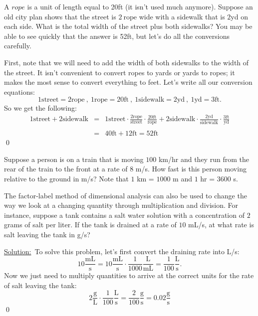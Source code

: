 \begin{eg} A $rope$ is a unit of length equal to 20ft (it isn't used much anymore). Suppose an old city plan shows that the street is $2\ \mbox{rope}$ wide with a sidewalk that is $2$yd on each side. What is the total width of the street plus both sidewalks? You may be able to see quickly that the answer is 52ft,  but let's do all the conversions carefully.

\par 

First, note that we will need to add the width of both sidewalks to the width of the street. It isn't convenient to convert ropes to yards or yards to ropes; it makes the most sense to convert everything to feet. Let's write all our conversion equations:
\[
1 \mbox{street} = 2 \mbox{rope}\ ,\ 1\mbox{rope} = 20\mbox{ft}\ ,\ 1\mbox{sidewalk} = 2\mbox{yd}\ ,\ 1\mbox{yd} = 3\mbox{ft}.
\]
So we get the following:
\begin{eqnarray*}
1\mbox{street} + 2\mbox{sidewalk} & = & 1\mbox{street}\cdot\frac{2\mbox{rope}}{\mbox{street}}\cdot\frac{20\mbox{ft}}{\mbox{rope}} + 2\mbox{sidewalk}\cdot\frac{2\mbox{yd}}{\mbox{sidewalk}}\cdot\frac{3\mbox{ft}}{\mbox{yd}}\\\\
\ & = & 40\mbox{ft}+12\mbox{ft}= 52\mbox{ft}
\end{eqnarray*}\qed
\end{eg}
\par

\begin{question} Suppose a person is on a train that is moving $100$ km/hr and they run from the rear of the train to the front at a rate of $8$ m/s. How fast is this person moving relative to the ground in m/s? Note that $1$ km = $1000$ m and $1$ hr = $3600$ s.
\end{question}

\par

\begin{eg} The factor-label method of dimensional analysis can also be used to change the way we look at a changing quantity through multiplication and division. For instance, suppose a tank contains a salt water solution with a concentration of $2$ grams of salt per liter. If the tank is drained at a rate of $10$ mL/s, at what rate is salt leaving the tank in g/s?

\par

\underline{Solution:}\ \normalfont To solve this problem, let's first convert the draining rate into L/s: 
\[
10 \frac{\mbox{mL}}{\mbox{s}} = 10 \frac{\mbox{mL}}{\mbox{s}}\cdot \frac{1}{1000}\frac{\mbox{L}}{\mbox{mL}} = \frac{1}{100} \frac{\mbox{L}}{\mbox{s}}.
\]
Now we just need to multiply quantities to arrive at the correct units for the rate of salt leaving the tank:
\[
2\frac{\mbox{g}}{\mbox{L}}\cdot\frac{1}{100}\frac{\mbox{L}}{\mbox{s}} = \frac{2}{100}\frac{\mbox{g}}{\mbox{s}} = 0.02\frac{\mbox{g}}{\mbox{s}}
\]\qed
\end{eg}

